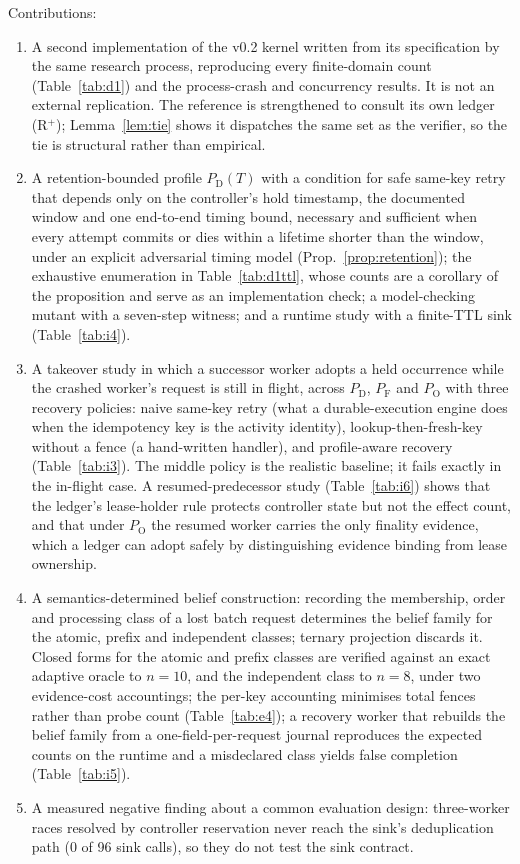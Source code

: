 \documentclass[conference,10pt]{IEEEtran}
\newcommand{\PD}{P_{\mathrm{D}}}
\newcommand{\PDT}{P_{\mathrm{D}}(T)}
\newcommand{\PF}{P_{\mathrm{F}}}
\newcommand{\PO}{P_{\mathrm{O}}}
\begin{document}
Contributions:
\begin{enumerate}
\item A second implementation of the v0.2 kernel written from its specification by the same research process, reproducing every finite-domain count (Table~\ref{tab:d1}) and the process-crash and concurrency results. It is not an external replication. The reference is strengthened to consult its own ledger (R$^{+}$); Lemma~\ref{lem:tie} shows it dispatches the same set as the verifier, so the tie is structural rather than empirical.
\item A retention-bounded profile $\PDT$ with a condition for safe same-key retry that depends only on the controller's hold timestamp, the documented window and one end-to-end timing bound, necessary and sufficient when every attempt commits or dies within a lifetime shorter than the window, under an explicit adversarial timing model (Prop.~\ref{prop:retention}); the exhaustive enumeration in Table~\ref{tab:d1ttl}, whose counts are a corollary of the proposition and serve as an implementation check; a model-checking mutant with a seven-step witness; and a runtime study with a finite-TTL sink (Table~\ref{tab:i4}).
\item A takeover study in which a successor worker adopts a held occurrence while the crashed worker's request is still in flight, across $\PD$, $\PF$ and $\PO$ with three recovery policies: naive same-key retry (what a durable-execution engine does when the idempotency key is the activity identity), lookup-then-fresh-key without a fence (a hand-written handler), and profile-aware recovery (Table~\ref{tab:i3}). The middle policy is the realistic baseline; it fails exactly in the in-flight case. A resumed-predecessor study (Table~\ref{tab:i6}) shows that the ledger's lease-holder rule protects controller state but not the effect count, and that under $\PO$ the resumed worker carries the only finality evidence, which a ledger can adopt safely by distinguishing evidence binding from lease ownership.
\item A semantics-determined belief construction: recording the membership, order and processing class of a lost batch request determines the belief family for the atomic, prefix and independent classes; ternary projection discards it. Closed forms for the atomic and prefix classes are verified against an exact adaptive oracle to $n=10$, and the independent class to $n=8$, under two evidence-cost accountings; the per-key accounting minimises total fences rather than probe count (Table~\ref{tab:e4}); a recovery worker that rebuilds the belief family from a one-field-per-request journal reproduces the expected counts on the runtime and a misdeclared class yields false completion (Table~\ref{tab:i5}).
\item A measured negative finding about a common evaluation design: three-worker races resolved by controller reservation never reach the sink's deduplication path (0 of 96 sink calls), so they do not test the sink contract.
\end{enumerate}
\end{document}
